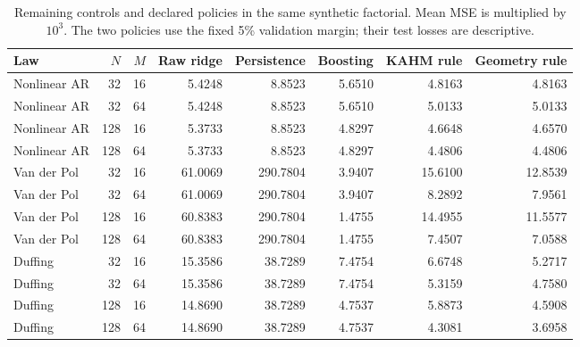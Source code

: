 \begin{table}[!htbp]
\centering\small\setlength{\tabcolsep}{4pt}
\caption{Remaining controls and declared policies in the same synthetic factorial. Mean MSE is multiplied by $10^3$. The two policies use the fixed 5\% validation margin; their test losses are descriptive.}
\label{tab:utility-synthetic-controls}
\begin{tabular}{lrrrrrrr}
\toprule
Law & $N$ & $M$ & Raw ridge & Persistence & Boosting & KAHM rule & Geometry rule \\
\midrule
Nonlinear AR & 32 & 16 & 5.4248 & 8.8523 & 5.6510 & 4.8163 & 4.8163 \\
Nonlinear AR & 32 & 64 & 5.4248 & 8.8523 & 5.6510 & 5.0133 & 5.0133 \\
Nonlinear AR & 128 & 16 & 5.3733 & 8.8523 & 4.8297 & 4.6648 & 4.6570 \\
Nonlinear AR & 128 & 64 & 5.3733 & 8.8523 & 4.8297 & 4.4806 & 4.4806 \\
Van der Pol & 32 & 16 & 61.0069 & 290.7804 & 3.9407 & 15.6100 & 12.8539 \\
Van der Pol & 32 & 64 & 61.0069 & 290.7804 & 3.9407 & 8.2892 & 7.9561 \\
Van der Pol & 128 & 16 & 60.8383 & 290.7804 & 1.4755 & 14.4955 & 11.5577 \\
Van der Pol & 128 & 64 & 60.8383 & 290.7804 & 1.4755 & 7.4507 & 7.0588 \\
Duffing & 32 & 16 & 15.3586 & 38.7289 & 7.4754 & 6.6748 & 5.2717 \\
Duffing & 32 & 64 & 15.3586 & 38.7289 & 7.4754 & 5.3159 & 4.7580 \\
Duffing & 128 & 16 & 14.8690 & 38.7289 & 4.7537 & 5.8873 & 4.5908 \\
Duffing & 128 & 64 & 14.8690 & 38.7289 & 4.7537 & 4.3081 & 3.6958 \\
\bottomrule
\end{tabular}
\end{table}
